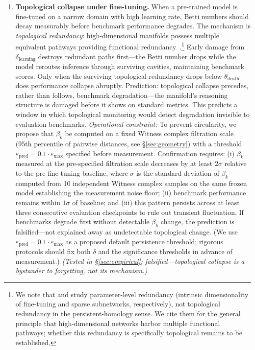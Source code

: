 \documentclass{article}
\begin{document}
\begin{enumerate}
    \item \textbf{Topological collapse under fine-tuning.} When a pre-trained model is fine-tuned on a narrow domain with high learning rate, Betti numbers should decay measurably before benchmark performance degrades. The mechanism is \emph{topological redundancy}: high-dimensional manifolds possess multiple equivalent pathways providing functional redundancy~\citep{Aghajanyan2021intrinsic,Frankle2019lottery}.\footnote{We note that \citet{Aghajanyan2021intrinsic} and \citet{Frankle2019lottery} study parameter-level redundancy (intrinsic dimensionality of fine-tuning and sparse subnetworks, respectively), not topological redundancy in the persistent-homology sense. We cite them for the general principle that high-dimensional networks harbor multiple functional pathways; whether this redundancy is specifically topological remains to be established.} Early damage from $\delta_{\text{learning}}$ destroys redundant paths first---the Betti number drops while the model reroutes inference through surviving cavities, maintaining benchmark scores. Only when the surviving topological redundancy drops below $\theta_{\text{death}}$ does performance collapse abruptly. Prediction: topological collapse precedes, rather than follows, benchmark degradation---the manifold's reasoning structure is damaged before it shows on standard metrics. This predicts a window in which topological monitoring would detect degradation invisible to evaluation benchmarks. \emph{Operational constraint:} To prevent circularity, we propose that $\beta_k$ be computed on a fixed Witness complex filtration scale (95th percentile of pairwise distances, see \S\ref{sec:geometry}) with a threshold $\varepsilon_{\text{pred}} = 0.1 \cdot \varepsilon_{\max}$ specified before measurement. Confirmation requires: (i) $\beta_k$ measured at the pre-specified filtration scale decreases by at least $2\sigma$ relative to the pre-fine-tuning baseline, where $\sigma$ is the standard deviation of $\beta_k$ computed from 10 independent Witness complex samples on the same frozen model establishing the measurement noise floor; (ii) benchmark performance remains within $1\sigma$ of baseline; and (iii) this pattern persists across at least three consecutive evaluation checkpoints to rule out transient fluctuation. If benchmarks degrade first without detectable $\beta_k$ change, the prediction is falsified---not explained away as undetectable topological change. (We use $\varepsilon_{\text{pred}} = 0.1 \cdot \varepsilon_{\max}$ as a proposed default persistence threshold; rigorous protocols should fix both $\delta$ and the significance thresholds in advance of measurement.) \emph{(Tested in \S\ref{sec:empirical}; falsified---topological collapse is a bystander to forgetting, not its mechanism.)}


\end{enumerate}
\end{document}
